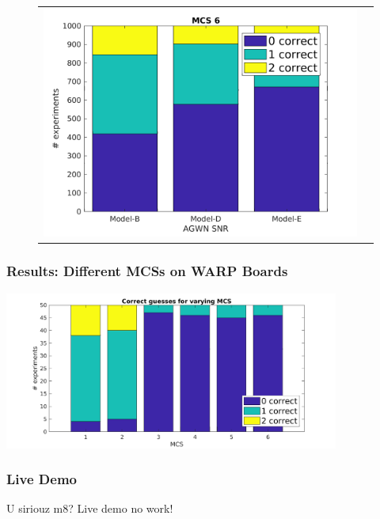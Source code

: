 \documentclass[accentcolor=tud8b,colorbacktitle]{tudbeamer}
\begin{document}
\begin{frame}
\begin{figure}[H]
\begin{tabular}{cc}
		\includegraphics[height=0.52\textheight]{../../gfx/plots/tgn-mcs6} \\
	\end{tabular}
\end{figure}
\end{frame}


\begin{frame}
\frametitle{Results: Different MCSs on WARP Boards}
\begin{centering}
	\includegraphics[width=11cm]{../../gfx/plots/warp-mcs}\\
\end{centering}
\end{frame}


\begin{frame}
\frametitle{Live Demo}
\begin{center}
	\vspace{1.45cm}
	\Huge U siriouz m8? Live demo no work!
\end{center}
\end{frame}
\end{document}
